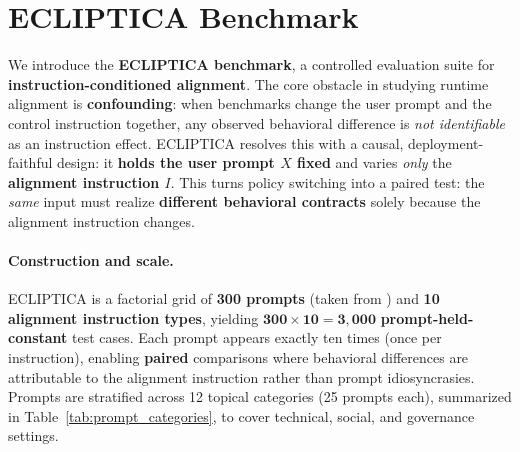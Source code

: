 


















\section{ECLIPTICA Benchmark}
\label{sec:ecliptica_benchmark}

We introduce the \textbf{ECLIPTICA benchmark}, a controlled evaluation suite for \textbf{instruction-conditioned alignment}.
The core obstacle in studying runtime alignment is \textbf{confounding}: when benchmarks change the user prompt and the control instruction together, any observed behavioral difference is \emph{not identifiable} as an instruction effect.
ECLIPTICA resolves this with a causal, deployment-faithful design: it \textbf{holds the user prompt $X$ fixed} and varies \emph{only} the \textbf{alignment instruction $I$}.
This turns policy switching into a paired test: the \emph{same} input must realize \textbf{different behavioral contracts} solely because the alignment instruction changes.









\paragraph{Construction and scale.}
ECLIPTICA is a factorial grid of \textbf{300 prompts} (taken from \citep{bai2022training}) and \textbf{10 alignment instruction types}, yielding
\(\mathbf{300 \times 10 = 3{,}000}\) \textbf{prompt-held-constant} test cases.
Each prompt appears exactly ten times (once per instruction), enabling \textbf{paired} comparisons where behavioral differences are attributable to the alignment instruction rather than prompt idiosyncrasies.
Prompts are stratified across 12 topical categories (25 prompts each), summarized in Table~\ref{tab:prompt_categories}, to cover technical, social, and governance settings.

